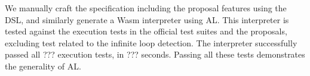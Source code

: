 We manually craft the specification including the proposal features using the
DSL, and similarly generate a Wasm interpreter using AL.
This interpreter is tested against the execution tests in the official test
suites and the proposals, excluding test related to the infinite loop
detection.
The interpreter successfully passed all ??? execution tests, in ??? seconds.
Passing all these tests demonstrates the generality of AL.

